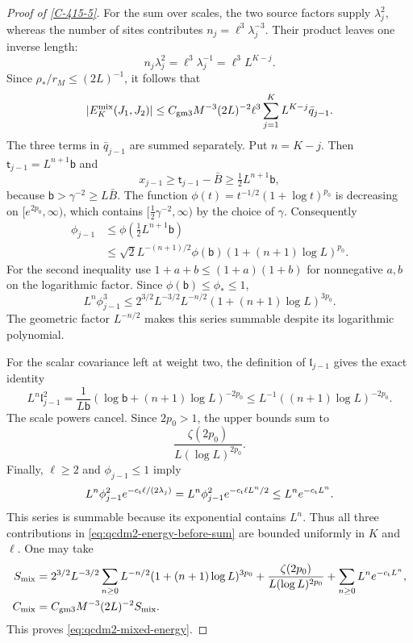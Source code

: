 \documentclass[11pt,letterpaper,reqno]{amsart}
\theoremstyle{definition}
\theoremstyle{remark}
\begin{document}
\begin{proof}[Proof of \cref{C-415-5}]
For the sum over scales, the two source factors supply
$\lambda_j^2$, whereas the number of sites contributes
$n_j=\ell^3\lambda_j^{-3}$.  Their product leaves one
inverse length:
\[
 n_j\lambda_j^2=\ell^3\lambda_j^{-1}
                      =\ell^3L^{K-j}.
\]
Since $\rho_*/r_M\le(2L)^{-1}$, it follows that
\begin{equation}\label{eq:qcdm2-energy-before-sum}
 |E_K^{\rm mix}(J_1,J_2)|
 \le C_{\rm gm3}M^{-3}(2L)^{-2}\ell^3
                       \sum_{j=1}^K L^{K-j}\bar q_{j-1}.
\end{equation}
The three terms in $\bar q_{j-1}$ are summed separately.
Put $n=K-j$.  Then
$\mathsf t_{j-1}=L^{n+1}\mathsf b$ and
\[
 x_{j-1}\ge\mathsf t_{j-1}-\bar B
              \ge\tfrac12 L^{n+1}\mathsf b,
\]
because $\mathsf b>\gamma^{-2}\ge L\bar B$.
The function $\phi(t)=t^{-1/2}(1+\log t)^{p_0}$ is
decreasing on $[e^{2p_0},\infty)$, which contains
$[\frac12\gamma^{-2},\infty)$ by the choice of $\gamma$.
Consequently
\begin{align*}
 \phi_{j-1}
 &\le\phi(\tfrac12L^{n+1}\mathsf b)\\
 &\le\sqrt2L^{-(n+1)/2}\phi(\mathsf b)
                       (1+(n+1)\log L)^{p_0}.
\end{align*}
For the second inequality use
$1+a+b\le(1+a)(1+b)$ for nonnegative $a,b$ on the
logarithmic factor.  Since $\phi(\mathsf b)\le\phi_*\le1$,
\[
 L^n\phi_{j-1}^3
 \le2^{3/2}L^{-3/2}L^{-n/2}
                       (1+(n+1)\log L)^{3p_0}.
\]
The geometric factor $L^{-n/2}$ makes this series
summable despite its logarithmic polynomial.

For the scalar covariance left at weight two, the
definition of $\mathfrak l_{j-1}$ gives the exact identity
\[
 L^n\mathfrak l_{j-1}^2
  =\frac{1}{L\mathsf b}
       (\log\mathsf b+(n+1)\log L)^{-2p_0}
  \le L^{-1}((n+1)\log L)^{-2p_0}.
\]
The scale powers cancel. Since $2p_0>1$, the upper bounds sum to
\[
 \frac{\zeta(2p_0)}{L(\log L)^{2p_0}}.
\]
Finally, $\ell\ge2$ and $\phi_{j-1}\le1$ imply
\[
 L^n\phi_{j-1}^2e^{-c_{\rm t}\ell/(2\lambda_j)}
   =L^n\phi_{j-1}^2e^{-c_{\rm t}\ell L^n/2}
   \le L^ne^{-c_{\rm t}L^n}.
\]
This series is summable because its exponential contains
$L^n$.  Thus all three contributions in
\eqref{eq:qcdm2-energy-before-sum} are bounded uniformly
in $K$ and $\ell$.  One may take
\begin{align*}
 S_{\rm mix}
 &=2^{3/2}L^{-3/2}\sum_{n\ge0}
        L^{-n/2}(1+(n+1)\log L)^{3p_0}
       +\frac{\zeta(2p_0)}{L(\log L)^{2p_0}}
       +\sum_{n\ge0}L^ne^{-c_{\rm t}L^n},\\
 C_{\rm mix}&=C_{\rm gm3}M^{-3}(2L)^{-2}S_{\rm mix}.
\end{align*}
This proves \eqref{eq:qcdm2-mixed-energy}.
\end{proof}
\end{document}
